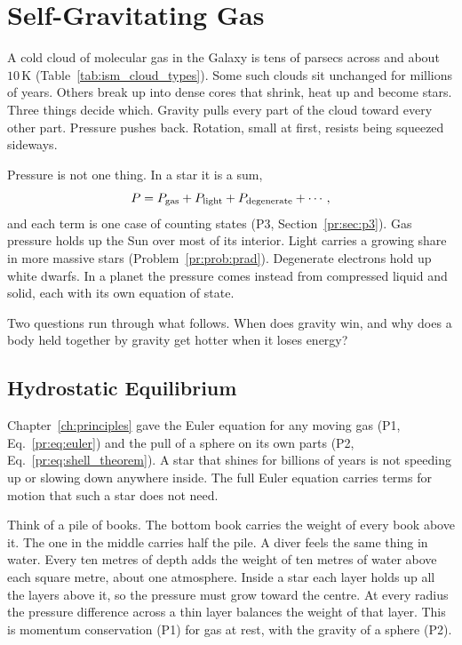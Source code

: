 \chapter{Self-Gravitating Gas}
\label{ch:selfgrav}

A cold cloud of molecular gas in the Galaxy is tens of parsecs across and about $10\,\mathrm K$ (Table~\ref{tab:ism_cloud_types}). Some such clouds sit unchanged for millions of years. Others break up into dense cores that shrink, heat up and become stars. Three things decide which. Gravity pulls every part of the cloud toward every other part. Pressure pushes back. Rotation, small at first, resists being squeezed sideways.

Pressure is not one thing. In a star it is a sum,
\[
P=P_{\rm gas}+P_{\rm light}+P_{\rm degenerate}+\cdots,
\]
and each term is one case of counting states (P3, Section~\ref{pr:sec:p3}). Gas pressure holds up the Sun over most of its interior. Light carries a growing share in more massive stars (Problem~\ref{pr:prob:prad}). Degenerate electrons hold up white dwarfs. In a planet the pressure comes instead from compressed liquid and solid, each with its own equation of state.

Two questions run through what follows. When does gravity win, and why does a body held together by gravity get hotter when it loses energy?

\section{Hydrostatic Equilibrium}
\label{sg:sec:hse}

Chapter~\ref{ch:principles} gave the Euler equation for any moving gas (P1, Eq.~\eqref{pr:eq:euler}) and the pull of a sphere on its own parts (P2, Eq.~\eqref{pr:eq:shell_theorem}). A star that shines for billions of years is not speeding up or slowing down anywhere inside. The full Euler equation carries terms for motion that such a star does not need.

Think of a pile of books. The bottom book carries the weight of every book above it. The one in the middle carries half the pile. A diver feels the same thing in water. Every ten metres of depth adds the weight of ten metres of water above each square metre, about one atmosphere. Inside a star each layer holds up all the layers above it, so the pressure must grow toward the centre. At every radius the pressure difference across a thin layer balances the weight of that layer. This is momentum conservation (P1) for gas at rest, with the gravity of a sphere (P2).


